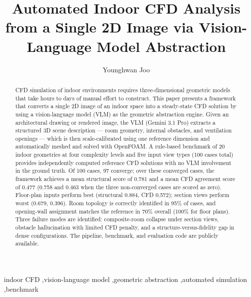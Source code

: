 \documentclass[preprint,12pt,number]{elsarticle}
\begin{document}
\begin{frontmatter}

\title{Automated Indoor CFD Analysis from a Single 2D Image via Vision-Language Model Abstraction}

\author[kier,ust]{Younghwan Joo}
\address[kier]{Energy Efficiency Research Division, Korea Institute of Energy Research, 152 Gajeong-ro, Yuseong-gu, Daejeon 34129, Republic of Korea}
\address[ust]{Energy Engineering, University of Science \& Technology, 217 Gajeong-ro, Yuseong-gu, Daejeon 34129, Republic of Korea}

\begin{abstract}
CFD simulation of indoor environments requires three-dimensional geometric models that take hours to days of manual effort to construct. This paper presents a framework that converts a single 2D image of an indoor space into a steady-state CFD solution by using a vision-language model (VLM) as the geometric abstraction engine. Given an architectural drawing or rendered image, the VLM (Gemini 3.1 Pro) extracts a structured 3D scene description --- room geometry, internal obstacles, and ventilation openings --- which is then scale-calibrated using one reference dimension and automatically meshed and solved with OpenFOAM. A rule-based benchmark of 20 indoor geometries at four complexity levels and five input view types (100 cases total) provides independently computed reference CFD solutions with no VLM involvement in the ground truth. Of 100 cases, 97 converge; over these converged cases, the framework achieves a mean structural score of 0.781 and a mean CFD agreement score of 0.477 (0.758 and 0.463 when the three non-converged cases are scored as zero). Floor-plan inputs perform best (structural 0.884, CFD 0.572); section views perform worst (0.679, 0.396). Room topology is correctly identified in 95\% of cases, and opening-wall assignment matches the reference in 70\% overall (100\% for floor plans). Three failure modes are identified: composite-room collapse under section views, obstacle hallucination with limited CFD penalty, and a structure-versus-fidelity gap in dense configurations. The pipeline, benchmark, and evaluation code are publicly available.
\end{abstract}

\begin{keyword}
indoor CFD \sep vision-language model \sep geometric abstraction \sep automated simulation \sep benchmark
\end{keyword}

\end{frontmatter}
\end{document}
